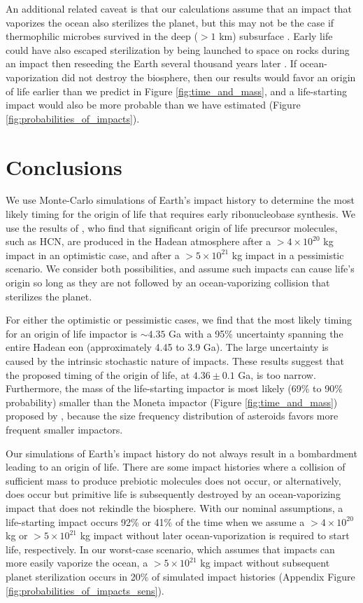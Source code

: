 \documentclass{aastex631}
\begin{document}
An additional related caveat is that our calculations assume that an impact that vaporizes the ocean also sterilizes the planet, but this may not be the case if thermophilic microbes survived in the deep ($> 1$ km) subsurface \citep{Sleep_1998,Zahnle_2006}. Early life could have also escaped sterilization by being launched to space on rocks during an impact then reseeding the Earth several thousand years later \citep{Wells_2003,Gladman_2005}. If ocean-vaporization did not destroy the biosphere, then our results would favor an origin of life earlier than we predict in Figure \ref{fig:time_and_mass}, and a life-starting impact would also be more probable than we have estimated (Figure \ref{fig:probabilities_of_impacts}).

\section{Conclusions}

We use Monte-Carlo simulations of Earth's impact history to determine the most likely timing for the origin of life that requires early ribonucleobase synthesis. We use the results of \citet{Wogan_2023}, who find that significant origin of life precursor molecules, such as HCN, are produced in the Hadean atmosphere after a $> 4 \times 10^{20}$ kg impact in an optimistic case, and after a $> 5 \times 10^{21}$ kg impact in a pessimistic scenario. We consider both possibilities, and assume such impacts can cause life's origin so long as they are not followed by an ocean-vaporizing collision that sterilizes the planet.

For either the optimistic or pessimistic cases, we find that the most likely timing for an origin of life impactor is $\sim 4.35$ Ga with a 95\% uncertainty spanning the entire Hadean eon (approximately 4.45 to 3.9 Ga). The large uncertainty is caused by the intrinsic stochastic nature of impacts. These results suggest that the \citet{Benner_2020} proposed timing of the origin of life, at $4.36 \pm 0.1$ Ga, is too narrow. Furthermore, the mass of the life-starting impactor is most likely (69\% to 90\% probability) smaller than the Moneta impactor (Figure \ref{fig:time_and_mass}) proposed by \citet{Benner_2020}, because the size frequency distribution of asteroids favors more frequent smaller impactors.

Our simulations of Earth's impact history do not always result in a bombardment leading to an origin of life. There are some impact histories where a collision of sufficient mass to produce prebiotic molecules does not occur, or alternatively, does occur but primitive life is subsequently destroyed by an ocean-vaporizing impact that does not rekindle the biosphere. With our nominal assumptions, a life-starting impact occurs 92\% or 41\% of the time when we assume a $> 4 \times 10^{20}$ kg or $> 5 \times 10^{21}$ kg impact without later ocean-vaporization is required to start life, respectively. In our worst-case scenario, which assumes that impacts can more easily vaporize the ocean, a $> 5 \times 10^{21}$ kg impact without subsequent planet sterilization occurs in 20\% of simulated impact histories (Appendix Figure \ref{fig:probabilities_of_impacts_sens}).
\end{document}
